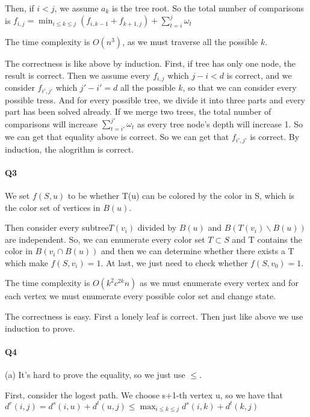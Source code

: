 \documentclass[UTF8]{ctexart}
\renewcommand{\(}{\left(}
\renewcommand{\)}{\right)}
\begin{document}
Then, if $i < j$, we assume $a_{k}$ is the tree root. So the total number of comparisons is
$f_{i,j} = \min_{i \leq k \leq j} ( f_{i, k-1} + f_{k+1,j})  + \sum_{t=i}^{j}{\omega_{t}} $

The time complexity is $O(n^{3})$, as we must traverse all the possible $k$.

The correctness is like above by induction. First, if tree has only one node, the result is correct.
Then we assume every $f_{i,j}$ which $j - i < d$ is correct, and we consider $f_{i',j'}$ which $j' - i' = d$ all the possible $k$, so that we can consider 
every possible tress. And for every possible tree, we divide it into three parts and every part
has been solved already. If we merge two trees, the total number of comparisons
will increase $\sum_{t=i'}^{j'}{\omega_{t}}$ as every tree node's depth will increase 1. So we can get that
equality above is correct. So we can get that $f_{i',j'}$ is correct. By induction, the alogrithm is correct.

\paragraph{Q3}

We set $f(S,u)$ to be whether T(u) can be colored by the color in S, which is the color set of 
vertices in $B(u)$. 

Then consider every subtree$T(v_{i})$ divided by $B(u)$ and $B(T(v_{i})\backslash B(u))$ are independent. 
So, we can enumerate every color set $T\subset S$ and T contains the color in $B(v_{i} \cap B(u))$
and then we can determine whether there exists a T which make $f(S,v_{i}) = 1$. At last, we just 
need to check whether $f(S,v_{0}) = 1$. 

The time complexity is $O(k^{2}c^{2k}n)$ as we must enumerate every vertex and for each vertex 
we must enumerate every possible color set and change state.

The correctness is easy. First a lonely leaf is correct. Then just like above we use induction to prove.

\paragraph {Q4}

(a) It's hard to prove the equality, so we just use $\leq$.

First, consider the logest path. We choose s+1-th vertex u, so we have that
$d^{r}(i,j) = d^{s}(i,u) + d^{t}(u,j) \leq \max_{i \leq k \leq j}{d^{s}(i,k) + d^{t}(k,j)}$
\end{document}
